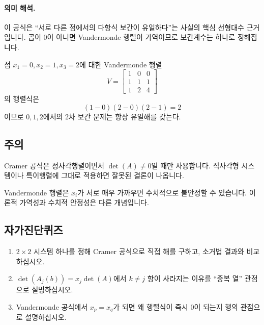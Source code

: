 \paragraph{의미 해석.}
이 공식은 ``서로 다른 점에서의 다항식 보간이 유일하다''는 사실의 핵심 선형대수 근거입니다. 곱이 0이 아니면 Vandermonde 행렬이 가역이므로 보간계수는 하나로 정해집니다.

\begin{example}
점 $x_1=0,x_2=1,x_3=2$에 대한 Vandermonde 행렬
$$
V=
\begin{bmatrix}
1&0&0\\
1&1&1\\
1&2&4
\end{bmatrix}
$$
의 행렬식은
$$
(1-0)(2-0)(2-1)=2
$$
이므로 $0,1,2$에서의 2차 보간 문제는 항상 유일해를 갖는다.
\end{example}

\subsection*{주의}
\begin{warning}
Cramer 공식은 정사각행렬이면서 $\det(A)\ne0$일 때만 사용합니다. 직사각형 시스템이나 특이행렬에 그대로 적용하면 잘못된 결론이 나옵니다.
\end{warning}
\begin{warning}
Vandermonde 행렬은 $x_i$가 서로 매우 가까우면 수치적으로 불안정할 수 있습니다. 이론적 가역성과 수치적 안정성은 다른 개념입니다.
\end{warning}

\subsection*{자가진단퀴즈}
\begin{enumerate}[label=\arabic*.]
\item $2\times2$ 시스템 하나를 정해 Cramer 공식으로 직접 해를 구하고, 소거법 결과와 비교하십시오.
\item $\det(A_j(b))=x_j\det(A)$에서 $k\ne j$ 항이 사라지는 이유를 ``중복 열'' 관점으로 설명하십시오.
\item Vandermonde 공식에서 $x_p=x_q$가 되면 왜 행렬식이 즉시 $0$이 되는지 행의 관점으로 설명하십시오.
\end{enumerate}


